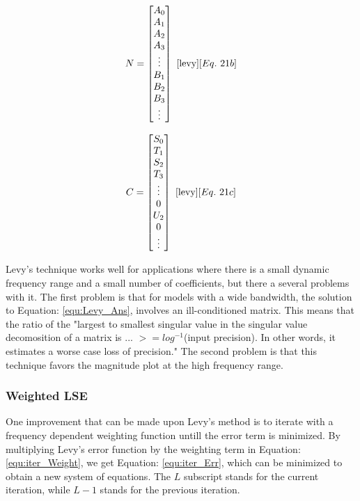 \begin{multicols}{2}
\begin{equation}
\label{equ:Levy_N}
N = 
\begin{bmatrix}
A_0 \\
A_1 \\
A_2 \\
A_3 \\
\vdots \\
B_1 \\
B_2 \\
B_3 \\
\vdots
\end{bmatrix}
~\cite{levy}[Eq.~21b]
\end{equation}

\begin{equation}
\label{equ:Levy_C}
C = 
\begin{bmatrix}
S_0 \\
T_1 \\
S_2 \\
T_3 \\
\vdots \\
0   \\
U_2 \\
0   \\
\vdots
\end{bmatrix}
~\cite{levy}[Eq.~21c]
\end{equation}
\end{multicols}

Levy's technique works well for applications where there is a small dynamic frequency range and a small number of coefficients, but there a several problems with it.
The first problem is that for models with a wide bandwidth, the solution to Equation: \eqref{equ:Levy_Ans}, involves an ill-conditioned matrix. This means that the ratio of the "largest to smallest singular value in the singular value decomosition of a matrix is ... $>= log^{-1}$(input precision). In other words, it estimates a worse case loss of precision."
The second problem is that this technique favors the magnitude plot at the high frequency range. 



\subsubsection{Weighted LSE}
\label{sec:weightedLSE}
One improvement that can be made upon Levy's method is to iterate with a frequency dependent weighting function untill the error term is minimized\cite{levy_iter}. By multiplying Levy's error function by the weighting term in Equation: \eqref{equ:iter_Weight}, we get Equation: \eqref{equ:iter_Err}, which can be minimized to obtain a new system of equations.
The $L$ subscript stands for the current iteration, while $L-1$ stands for the previous iteration.

